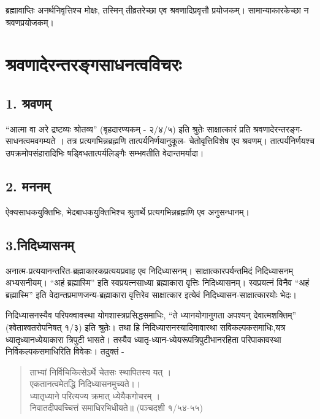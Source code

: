 {ब्रह्मावाप्तिः अनर्थनिवृत्तिश्च 	मोक्षः, तस्मिन् तीव्रतरेच्छा 	एव श्रवणादिप्रवृत्तौ प्रयोजकम्।  सामान्याकारकेच्छा न श्रवणप्रयोजकम्।

\section*{श्रवणादेरन्तरङ्गसाधनत्वविचरः}

\subsection*{1. श्रवणम्} 

“आत्मा वा अरे द्रष्टव्यः श्रोतव्य” (बृहदारण्यकम् - २/४/५) इति श्रुतेः साक्षात्कारं प्रति श्रवणादेरन्तरङ्ग-साधनत्वमवगम्यते । तत्र प्रत्यगभिन्नब्रह्मणि तात्पर्यनिर्णयानुकूल- चेतोवृत्तिविशेष एव श्रवणम्। तात्पर्यनिर्णयश्च उपक्रमोपसंहारादिभिः षड्विधतात्पर्यलिङ्गैः सम्भवतीति वेदान्तमर्यादा।

\subsection*{2. मननम् }

ऐक्यसाधकयुक्तिभिः, भेदबाधकयुक्तिभिश्च श्रुतार्थे प्रत्यगभिन्नब्रह्मणि एव अनुसन्धानम्।

\subsection*{3.निदिध्यासनम् }

अनात्म-प्रत्ययानन्तरित-ब्रह्माकारकप्रत्ययप्रवाह एव निदिध्यासनम्। साक्षात्कारपर्यन्तमिदं निदिध्यासनम् अभ्यसनीयम्। “अहं ब्रह्मास्मि” इति स्वप्रयत्नसाध्या ब्रह्माकारा वृत्तिः निदिध्यासनम्। स्वप्रयत्नं विनैव “अहं ब्रह्मास्मि” इति वेदान्तप्रमाणजन्य-ब्रह्माकारा वृत्तिरेव साक्षात्कार इत्येवं निदिध्यासन-साक्षात्कारयोः भेदः।

निदिध्यासनस्यैव परिपक्वावस्था योगशास्त्रप्रसिद्धसमाधिः, “ते ध्यानयोगानुगता अपश्यन् देवात्मशक्तिम्” (श्वेताश्वतरोपनिषत् १/३) इति श्रुतेः। तथा हि निदिध्यासनस्यादिमावास्था सविकल्पकसमाधिः,यत्र ध्यातृध्यानध्येयाकारा त्रिपुटी भासते। तस्यैव ध्यातृ-ध्यान-ध्येयरूपत्रिपुटीभानरहिता परिपाकावस्था निर्विकल्पकसमाधिरिति विवेकः। तदुक्तं - 

\begin{verse}
ताभ्यां निर्विचिकित्सेऽर्थे चेतसः स्थापितस्य यत् । \\
एकतानत्वमेतद्धि निदिध्यासनमुच्यते।।\\
ध्यातृध्याने परित्यज्य क्रमात् ध्येयैकगोचरम् ।\\ 
निवातदीपवच्चित्तं समाधिरभिधीयते॥ (पञ्चदशी १/५४-५५)
\end{verse}

}
